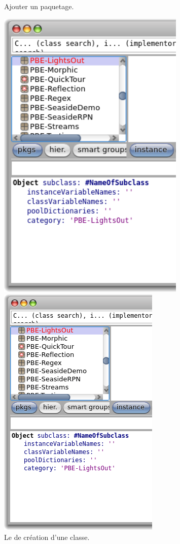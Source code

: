 \documentclass[a4paper,10pt,twoside]{book}
\begin{document}
\begin{figure}[htb]
\begin{minipage}[b]{0.48\textwidth}
	\caption{Ajouter un paquetage.
	}
\end{minipage}
\hfill
\begin{minipage}[b]{0.48\textwidth}
\ifluluelse
	{\centerline {\includegraphics[width=0.8\textwidth]{ClassTemplate}}}
	{\centerline {\includegraphics[scale=0.6]{ClassTemplate}}}
	\caption{Le  de création d'une classe.
	}
\end{minipage}
\end{figure}
\end{document}
